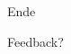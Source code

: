
\begin{frame}[standout]
    \Huge
    Ende
\end{frame}


\begin{frame}[standout]
    \Huge
    Feedback?
\end{frame}

\appendix
\backupbegin




\backupend

